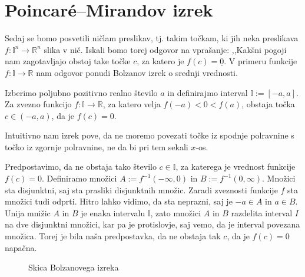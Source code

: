 \documentclass[mat1]{fmfdelo}
\newcommand{\R}{\mathbb R}
\newcommand{\I}{\mathbb I}
\newcommand{\0}{\underline{0}}
\begin{document}
\section{Poincar\'e--Mirandov izrek}\label{raz:PM}
Sedaj se bomo posvetili ničlam preslikav, tj. takim točkam, ki jih neka preslikava $f : \I^n \to \R^n$ slika v nič. Iskali bomo torej odgovor na vprašanje: ,,Kakšni pogoji nam zagotavljajo obstoj take točke $c$, za katero je $f(c) = \0$. V primeru funkcije $f : \I \to \R$ nam odgovor ponudi Bolzanov izrek o srednji vrednosti.
\begin{izrek}\label{izr:bolzano}
Izberimo poljubno pozitivno realno število $a$ in definirajmo interval $\I := [-a, a]$. Za zvezno funkcijo $f : \I \to \R$, za katero velja $f(-a) < 0 < f(a)$, obstaja točka $c \in (-a, a)$, da je $f(c) = 0$.
\end{izrek}
Intuitivno nam izrek pove, da ne moremo povezati točke iz spodnje polravnine s točko iz zgornje polravnine, ne da bi pri tem sekali $x$-os. 
\begin{dokaz}
Predpostavimo, da ne obstaja tako število $c \in \I$, za katerega je vrednost funkcije $f(c) = 0$. Definiramo množici $A := f^{-1}(- \infty, 0)$ in $B := f^{-1}(0, \infty)$. Množici sta disjunktni, saj sta prasliki disjunktnih množic. Zaradi zveznosti funkcije $f$ sta množici tudi odprti. Hitro lahko vidimo, da sta neprazni, saj je $-a \in A$ in $a \in B$. Unija mnižic $A$ in $B$ je enaka intervalu $\I$, zato množici $A$ in $B$ razdelita interval $I$ na dve disjunktni množici, kar pa je protislovje, saj vemo, da je interval povezana množica. Torej je bila naša predpostavka, da ne obstaja tak $c$, da je $f(c) = 0$ napačna.
\end{dokaz}

\begin{figure}[h!]
	\centering
	\caption{Skica Bolzanovega izreka}
\end{figure}
\end{document}
